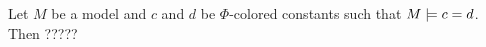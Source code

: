 \begin{comment}
\begin{lemma}
	Let $s$ and $t$ be terms such that no $x_i$ occurs in them, $\Phi$ a set of formulas and $M$ a model.
	Then $M\entails \lft{\Phi}{x}{s} = \lft{\Phi}{x}{t}$ implies that $M\entails s=t$.
	\label{lemma:lift_equality}
\end{lemma}
\begin{proof}
	Suppose no $\Delta$-term occurs in $s$ or $t$. Then $\lft{\Phi}{x}{s} = s$ 
	and $\lft{\Phi}{x}{t} = t$.

	Otherwise let $t_i$ be a maximal $\Delta$-term in $s$. Suppose it occurs at position $p$. In $\lft{\Phi}{x}{s}$, it is replaced by $x_i$.
	But as $M \entails \lft{\Phi}{x}{s} = \lft{\Phi}{x}{t}$, two situations can arise:
	\begin{compactenum}
	\item $x_i$ occurs at $p$ in $\lft{\Phi}{x}{t}$.
		As $x_i$ does not occur in $t$, it is placed there by the lifting.
		But $x_i$ is only employed in order to replace $t_i$, so at position $p$ in $t$, we have $t_i$.
	\item A term $r$ occurs at $p$ in $\lft{\Phi}{x}{t}$ which does not influence the evaluation of $\lft{\Phi}{x}{t}$ in $M$. This can be the case if $r$ is contained in a subterm of $u$ and in $M$, the function symbol of $u$ is interpreted such that it does not depend on the argument that contains $r$.
		
		But as the maximal $\Delta$-term $t_i$ occurs in $s$ at $p$ and $M \entails \lft{\Phi}{x}{s} = \lft{\Phi}{x}{t}$, there is a function symbol $u'$ in $\lft{\Phi}{x}{s}$ corresponding to $u$ which also does not depend on this argument.

		Hence even though $s$ and $t$ are not syntactically equal, $M\entails s=t$ in this case. \qedhere
	\end{compactenum}

\end{proof}
\end{comment}


\begin{exa}
	Let $M$ be a model and $c$ and $d$ be $\Phi$-colored constants such that $M\models c=d$.  
	Then ?????
\end{exa}






